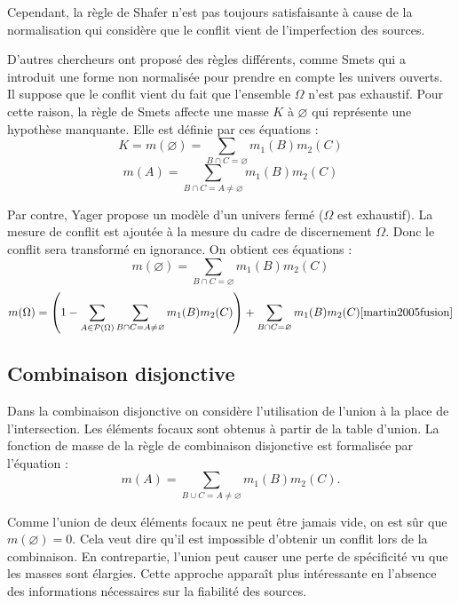Cependant, la règle de Shafer n’est pas toujours satisfaisante à cause de la
normalisation qui considère que le conflit vient de l’imperfection des sources.

D’autres chercheurs ont proposé des règles différents, comme Smets qui a introduit
une forme non normalisée pour prendre en compte les univers ouverts. Il suppose
que le conflit vient du fait que l’ensemble $\Omega$ n’est pas exhaustif. Pour
cette raison, la règle de Smets affecte une masse $K$ à $\varnothing$ qui représente
une hypothèse manquante. Elle est définie par ces équations :
\begin{equation}
K = m(\varnothing) = \sum_{B \cap C = \varnothing} m_1(B) m_2(C)
\end{equation}
\begin{equation}
m(A) = \sum_{B \cap C = A \neq \varnothing} m_1(B) m_2(C)
\end{equation}

Par contre, Yager propose un modèle d’un univers fermé ($\Omega$ est exhaustif).
La mesure de conflit est ajoutée à la mesure du cadre de discernement $\Omega$.
Donc le conflit sera transformé en ignorance. On obtient ces équations :
\begin{equation}
m(\varnothing) = \sum_{B \cap C = \varnothing} m_1(B) m_2(C)
\end{equation}
\begin{equation}
m(\Omega) = \left(1 - \sum_{A \in \mathcal{P}(\Omega)}
\sum_{B \cap C = A \neq \varnothing} m_1(B) m_2(C)\right) +
\sum_{B \cap C = \varnothing} m_1(B) m_2(C) \cite{martin2005fusion}
\end{equation}

\subsection{Combinaison disjonctive}

Dans la combinaison disjonctive on considère l’utilisation de l’union à la place
de l’intersection. Les éléments focaux sont obtenus à partir de la table d’union.
La fonction de masse de la règle de combinaison disjonctive est formalisée par l'équation :
\begin{equation}
m(A) = \sum_{B \cup C = A \neq \varnothing} m_1(B) m_2(C).
\end{equation}

Comme l’union de deux éléments focaux ne peut être jamais vide, on est sûr
que $m(\varnothing)=0$. Cela veut dire qu’il est impossible d’obtenir un conflit
lors de la combinaison. En contrepartie, l'union peut causer une perte de spécificité
vu que les masses sont élargies. Cette approche apparaît plus intéressante en
l’absence des informations nécessaires sur la fiabilité des sources.

